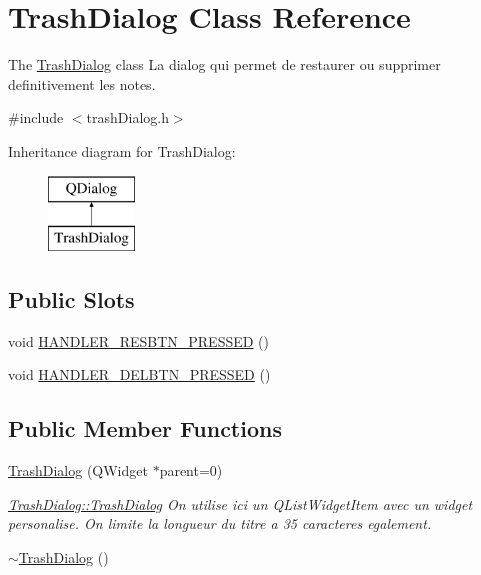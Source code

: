 \hypertarget{class_trash_dialog}{\section{Trash\-Dialog Class Reference}
\label{class_trash_dialog}
}


The \hyperlink{class_trash_dialog}{Trash\-Dialog} class La dialog qui permet de restaurer ou supprimer definitivement les notes.  




{\ttfamily \#include $<$trash\-Dialog.\-h$>$}

Inheritance diagram for Trash\-Dialog\-:\begin{figure}[H]
\begin{center}
\leavevmode
\includegraphics[height=2.000000cm]{class_trash_dialog}
\end{center}
\end{figure}
\subsection*{Public Slots}
\begin{DoxyCompactItemize}
\item 
void \hyperlink{class_trash_dialog_abe63bae09eed292bed543ad4d33c6300}{H\-A\-N\-D\-L\-E\-R\-\_\-\-R\-E\-S\-B\-T\-N\-\_\-\-P\-R\-E\-S\-S\-E\-D} ()
\item 
void \hyperlink{class_trash_dialog_a73cc627ab5d96dadfeb0e9db3d2a5412}{H\-A\-N\-D\-L\-E\-R\-\_\-\-D\-E\-L\-B\-T\-N\-\_\-\-P\-R\-E\-S\-S\-E\-D} ()
\end{DoxyCompactItemize}
\subsection*{Public Member Functions}
\begin{DoxyCompactItemize}
\item 
\hyperlink{class_trash_dialog_a3f9d43b2f58bd6575c10c0763bacb77b}{Trash\-Dialog} (Q\-Widget $\ast$parent=0)
\begin{DoxyCompactList}\small\item\em \hyperlink{class_trash_dialog_a3f9d43b2f58bd6575c10c0763bacb77b}{Trash\-Dialog\-::\-Trash\-Dialog} On utilise ici un Q\-List\-Widget\-Item avec un widget personalise. On limite la longueur du titre a 35 caracteres egalement. \end{DoxyCompactList}\item 
\hyperlink{class_trash_dialog_a0b5000c9bd33b204635cb7e1f830f7f0}{$\sim$\-Trash\-Dialog} ()
\end{DoxyCompactItemize}


